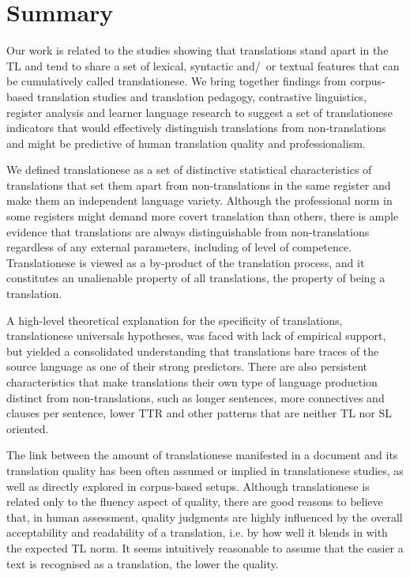 \section{\label{sec:sum2}Summary}
Our work is related to the studies showing that translations stand apart in the TL and tend to share a set of lexical, syntactic and/~or textual features that can be cumulatively called translationese. We bring together findings from corpus-based translation studies and translation pedagogy, contrastive linguistics, register analysis and learner language research to suggest a set of translationese indicators that would effectively distinguish translations from non-translations and might be predictive of human translation quality and professionalism. 

We defined translationese as a set of distinctive statistical characteristics of translations that set them apart from non-translations in the same register and make them an independent language variety. Although the professional norm in some registers might demand more covert translation than others, there is ample evidence that translations are always distinguishable from non-translations regardless of any external parameters, including of level of competence. Translationese is viewed as a by-product of the translation process, and it constitutes an unalienable property of all translations, the property of being a translation.  

A high-level theoretical explanation for the specificity of translations, translationese universals hypotheses, was faced with lack of empirical support, but yielded a consolidated understanding that translations bare traces of the source language as one of their strong predictors. There are also persistent characteristics that make translations their own type of language production distinct from non-translations, such as longer sentences, more connectives and clauses per sentence, lower TTR and other patterns that are neither TL nor SL oriented.

The link between the amount of translationese manifested in a document and its translation quality has been often assumed or implied in translationese studies, as well as directly explored in corpus-based setups. Although translationese is related only to the fluency aspect of quality, there are good reasons to believe that, in human assessment, quality judgments are highly influenced by the overall acceptability and readability of a translation, i.e. by how well it blends in with the expected TL norm. 
It seems intuitively reasonable to assume that the easier a text is recognised as a translation, the lower the quality. 

